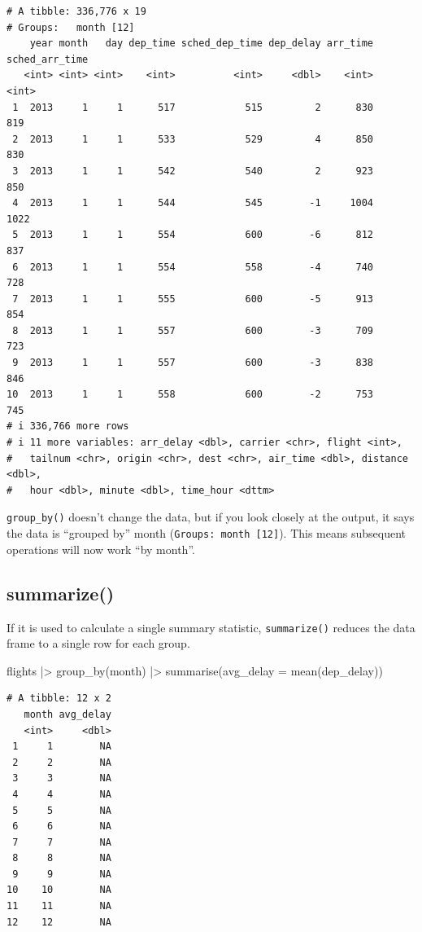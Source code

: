 \documentclass[
  letterpaper,
  DIV=11,
  numbers=noendperiod]{scrreprt}
\newenvironment{Shaded}{\begin{snugshade}}{\end{snugshade}}
\newcommand{\AttributeTok}[1]{\textcolor[rgb]{0.40,0.45,0.13}{#1}}
\newcommand{\FunctionTok}[1]{\textcolor[rgb]{0.28,0.35,0.67}{#1}}
\newcommand{\NormalTok}[1]{\textcolor[rgb]{0.00,0.23,0.31}{#1}}
\newcommand{\SpecialCharTok}[1]{\textcolor[rgb]{0.37,0.37,0.37}{#1}}
\begin{document}
\begin{verbatim}
# A tibble: 336,776 x 19
# Groups:   month [12]
    year month   day dep_time sched_dep_time dep_delay arr_time sched_arr_time
   <int> <int> <int>    <int>          <int>     <dbl>    <int>          <int>
 1  2013     1     1      517            515         2      830            819
 2  2013     1     1      533            529         4      850            830
 3  2013     1     1      542            540         2      923            850
 4  2013     1     1      544            545        -1     1004           1022
 5  2013     1     1      554            600        -6      812            837
 6  2013     1     1      554            558        -4      740            728
 7  2013     1     1      555            600        -5      913            854
 8  2013     1     1      557            600        -3      709            723
 9  2013     1     1      557            600        -3      838            846
10  2013     1     1      558            600        -2      753            745
# i 336,766 more rows
# i 11 more variables: arr_delay <dbl>, carrier <chr>, flight <int>,
#   tailnum <chr>, origin <chr>, dest <chr>, air_time <dbl>, distance <dbl>,
#   hour <dbl>, minute <dbl>, time_hour <dttm>
\end{verbatim}

\texttt{group\_by()} doesn't change the data, but if you look closely at
the output, it says the data is ``grouped by'' month
(\texttt{Groups:\ month\ {[}12{]}}). This means subsequent operations
will now work ``by month''.

\subsection{summarize()}\label{summarize}

If it is used to calculate a single summary statistic,
\texttt{summarize()} reduces the data frame to a single row for each
group.

\begin{Shaded}
\begin{Highlighting}[]
\NormalTok{flights }\SpecialCharTok{|\textgreater{}}
  \FunctionTok{group\_by}\NormalTok{(month) }\SpecialCharTok{|\textgreater{}}
  \FunctionTok{summarise}\NormalTok{(}\AttributeTok{avg\_delay =} \FunctionTok{mean}\NormalTok{(dep\_delay))}
\end{Highlighting}
\end{Shaded}

\begin{verbatim}
# A tibble: 12 x 2
   month avg_delay
   <int>     <dbl>
 1     1        NA
 2     2        NA
 3     3        NA
 4     4        NA
 5     5        NA
 6     6        NA
 7     7        NA
 8     8        NA
 9     9        NA
10    10        NA
11    11        NA
12    12        NA
\end{verbatim}
\end{document}
